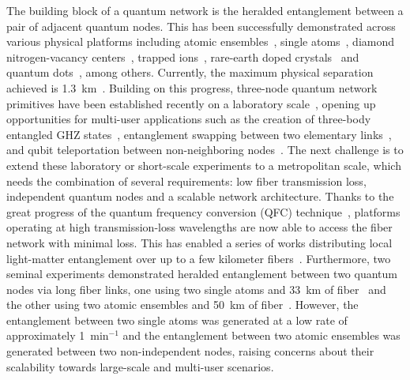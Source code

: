 \documentclass[aps,reprint,showpacs,superscriptaddress]{revtex4-2}
\begin{document}
The building block of a quantum network is the heralded entanglement between a pair of adjacent quantum nodes. This has been successfully demonstrated across various physical platforms including atomic ensembles~\cite{chou2005,chou2007,yuan2008}, single atoms~\cite{hofmann2012}, diamond nitrogen-vacancy centers~\cite{bernien2013,hensen2015,humphreys2018}, trapped ions~\cite{moehring2007}, rare-earth doped crystals~\cite{lago-rivera2021,liu2021m} and quantum dots~\cite{delteil2016,stockill2017}, among others. Currently, the maximum physical separation achieved is 1.3~km~\cite{hensen2015}. Building on this progress, three-node quantum network primitives have been established recently on a laboratory scale~\cite{jing2019,pompili2021,hermans2022a}, opening up opportunities for multi-user applications such as the creation of three-body entangled GHZ states~\cite{jing2019,pompili2021}, entanglement swapping between two elementary links~\cite{pompili2021}, and qubit teleportation between non-neighboring nodes~\cite{hermans2022a}. The next challenge is to extend these laboratory or short-scale experiments to a metropolitan scale, which needs the combination of several requirements: low fiber transmission loss, independent quantum nodes and a scalable network architecture. Thanks to the great progress of the quantum frequency conversion (QFC) technique~\cite{kumar1990}, platforms operating at high transmission-loss wavelengths are now able to access the fiber network with minimal loss. This has enabled a series of works distributing local light-matter entanglement over up to a few kilometer fibers~\cite{degreve2012,bock2018,vanleent2020,tchebotareva2019,krutyanskiy2019,luo2022}. Furthermore, two seminal experiments demonstrated heralded entanglement between two quantum nodes via long fiber links, one using two single atoms and 33~km of fiber~\cite{vanleent2022} and the other using two atomic ensembles and 50~km of fiber~\cite{yu2020}. However, the entanglement between two single atoms was generated at a low rate of approximately 1~min$^{-1}$ and the entanglement between two atomic ensembles was generated between two non-independent nodes, raising concerns about their scalability towards large-scale and multi-user scenarios.
\end{document}
